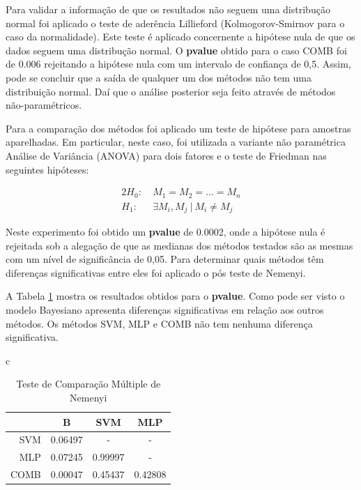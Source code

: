 \documentclass[12pt]{article}
\begin{document}
Para validar a informação de que os resultados não seguem uma distribução normal foi aplicado o teste de aderência Lillieford (Kolmogorov-Smirnov para o caso da normalidade). Este teste é aplicado concernente a hipótese nula de que os dados seguem uma distribução normal. O \textbf{pvalue} obtido para o caso COMB foi de 0.006 rejeitando a hipótese  nula com um intervalo de confiança de 0,5. Assim, pode se concluir que a saída de qualquer um dos métodos não  tem uma distribuição normal. Daí que o análise posterior seja feito  através de métodos não-paramétricos.


Para a comparação dos métodos foi aplicado um teste de hipótese para amostras aparelhadas. Em particular, neste caso, foi utilizada a variante não paramétrica Análise de Variância (ANOVA) para dois fatores e o teste de Friedman nas seguintes hipóteses:

\begin{alignat*}{2}
  H_0:  & \ M_1 = M_2 = ... =M_n \\
  H_1:  & \ \exists M_i,M_j \ | \ M_i\neq M_j
\end{alignat*}

Neste experimento foi obtido um \textbf{pvalue} de 0.0002, onde a hipótese nula é rejeitada sob a alegação de que as medianas dos métodos testados são as mesmas com um nível de significância de 0,05. Para determinar quais métodos têm diferenças significativas entre eles foi aplicado o pós teste de Nemenyi.

A Tabela \ref{tab:test_nemeyi} mostra os resultados obtidos para o \textbf{pvalue}. Como pode ser visto o modelo Bayesiano apresenta diferenças significativas em relação aos outros métodos. Os métodos SVM, MLP e  COMB não tem nenhuma diferença significativa.

\begin{table}[!h]
\renewcommand{\arraystretch}{1.3}
\caption{Teste de Comparação Múltiple de Nemenyi }
\label{tab:test_nemeyi}
\centering
\begin{tabular}{c}
\begin{tabular}{rccc}
\hline
    &B       &SVM     &MLP         \\    
\hline                             
SVM &0.06497 &-       &-           \\  
MLP &0.07245 &0.99997 &-           \\
COMB &0.00047 &0.45437 &0.42808    \\
\hline 
\end{tabular}\\
\end{tabular}
\end{table}
\end{document}
